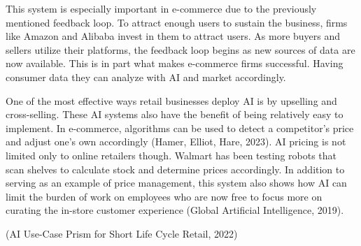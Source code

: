 \documentclass[
]{book}
\begin{document}
This system is especially important in e-commerce due to the previously mentioned feedback loop. To attract enough users to sustain the business, firms like Amazon and Alibaba invest in them to attract users. As more buyers and sellers utilize their platforms, the feedback loop begins as new sources of data are now available. This is in part what makes e-commerce firms successful. Having consumer data they can analyze with AI and market accordingly.

One of the most effective ways retail businesses deploy AI is by upselling and cross-selling. These AI systems also have the benefit of being relatively easy to implement. In e-commerce, algorithms can be used to detect a competitor's price and adjust one's own accordingly (Hamer, Elliot, Hare, 2023). AI pricing is not limited only to online retailers though. Walmart has been testing robots that scan shelves to calculate stock and determine prices accordingly. In addition to serving as an example of price management, this system also shows how AI can limit the burden of work on employees who are now free to focus more on curating the in-store customer experience (Global Artificial Intelligence, 2019).

(AI Use-Case Prism for Short Life Cycle Retail, 2022)

  
\end{document}
